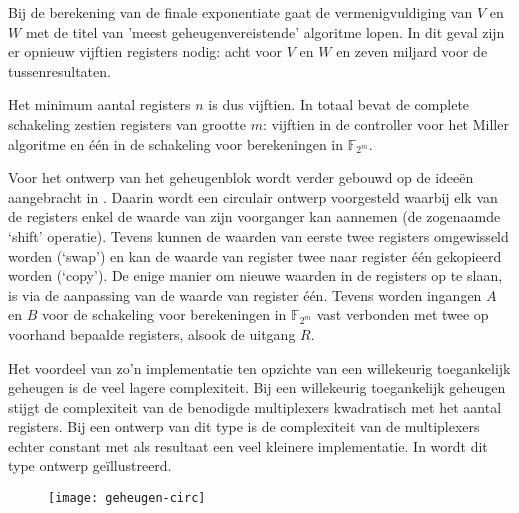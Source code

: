 Bij de berekening van de finale exponentiate gaat de vermenigvuldiging van $V$ en $W$ met de titel van 'meest geheugenvereistende' algoritme lopen. In dit geval zijn er opnieuw vijftien registers nodig: acht voor $V$ en $W$ en zeven miljard voor de tussenresultaten.

Het minimum aantal registers $n$ is dus vijftien. In totaal bevat de complete schakeling zestien registers van grootte $m$: vijftien in de controller voor het Miller algoritme en \'e\'en in de schakeling voor berekeningen in $\mathbb{F}_{2^m}$.

Voor het ontwerp van het geheugenblok wordt verder gebouwd op de idee\"en aangebracht in \cite{lee}. Daarin wordt een circulair ontwerp voorgesteld waarbij elk van de registers enkel de waarde van zijn voorganger kan aannemen (de zogenaamde `shift' operatie). Tevens kunnen de waarden van eerste twee registers omgewisseld worden (`swap') en kan de waarde van register twee naar register \'e\'en gekopieerd worden (`copy'). De enige manier om nieuwe waarden in de registers op te slaan, is via de aanpassing van de waarde van register \'e\'en. Tevens worden ingangen $A$ en $B$ voor de schakeling voor berekeningen in $\mathbb{F}_{2^m}$ vast verbonden met twee op voorhand bepaalde registers, alsook de uitgang $R$. 

Het voordeel van zo'n implementatie ten opzichte van een willekeurig toegankelijk geheugen is de veel lagere complexiteit. Bij een willekeurig toegankelijk geheugen stijgt de complexiteit van de benodigde multiplexers kwadratisch met het aantal registers. Bij een ontwerp van dit type is de complexiteit van de multiplexers echter constant met als resultaat een veel kleinere implementatie. In  wordt dit type ontwerp ge\"illustreerd.

\begin{figure}[h]
	\centering
		\texttt{[image: geheugen-circ]}
\end{figure}


